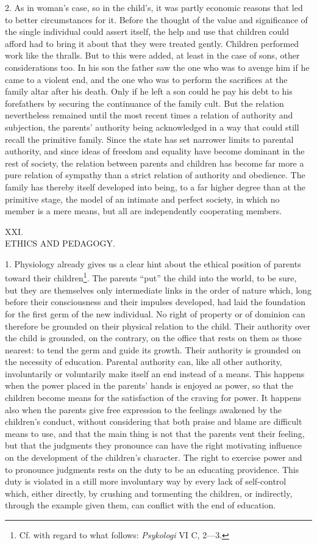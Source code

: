 \documentclass[12pt,a4paper,openany]{book}
\newcommand{\opage}[1]{\marginnote{\footnotesize\textit{[#1]}}}
\newcounter{etikch}
\newcommand{\chapterhead}[2]{\stepcounter{etikch}\bigskip\begin{center}\pdfbookmark[1]{#1 #2}{etikch.\arabic{etikch}}#1\\[3pt]{\large #2}\end{center}\medskip}
\begin{document}
2. As in woman's case, so in the child's, it was partly economic reasons that led to better circumstances for it.
Before the thought of the value and significance of the single individual could assert itself, the help and use that
children could afford had to bring it about that they were treated gently. Children performed work like the thralls.
But to this were added, at least in the case of sons, other considerations too. In his son the father saw the one who
was to avenge him if he came to a violent end, and the one who was to perform the sacrifices at the family altar after
his death. Only if he left a son could he pay his debt to his forefathers by securing the continuance of the family cult.
But the relation nevertheless remained until the most recent times a relation of authority and subjection, the parents'
authority being acknowledged in a way that could still recall the primitive family. Since the state has set narrower
limits to parental authority, and since ideas of freedom and equality have become dominant in the rest of society, the
relation between parents and children has become far more a pure relation of sympathy than a strict relation of
authority and obedience. The family has thereby itself developed into being, to a far higher degree than at the
primitive stage, the model of an intimate and perfect society, in which no member is a mere means, but all are
independently cooperating members.

\opage{329}\chapterhead{XXI.}{ETHICS AND PEDAGOGY.}

1. Physiology already gives us a clear hint about the ethical position of parents toward their children\footnote[1]{Cf.
with regard to what follows: \textit{Psykologi} VI C, 2---3.}. The parents ``put'' the child into the world, to be sure,
but they are themselves only intermediate links in the order of nature which, long before their consciousness and their
impulses developed, had laid the foundation for the first germ of the new individual. No right of property or of
dominion can therefore be grounded on their physical relation to the child. Their authority over the child is grounded,
on the contrary, on the office that rests on them as those nearest: to tend the germ and guide its growth. Their
authority is grounded on the necessity of education. Parental authority can, like all other authority, involuntarily or
voluntarily make itself an end instead of a means. This happens when the power placed in the parents' hands is enjoyed
as power, so that the children become means for the satisfaction of the craving for power. It happens also when the
parents give free expression to the feelings awakened by the children's conduct, without considering that both praise
and blame are difficult means to use, and that the main thing is not that the parents vent their feeling, but that the
judgments they pronounce can have the right motivating influence on the development of the children's character. The
right to exercise power and to pronounce judgments rests on the duty to be an educating providence. This duty is violated
in a still more involuntary way by every lack of self-control which, either directly, by crushing and tormenting the
children, or indirectly, through the example given them, can conflict with the end of education.
\end{document}
